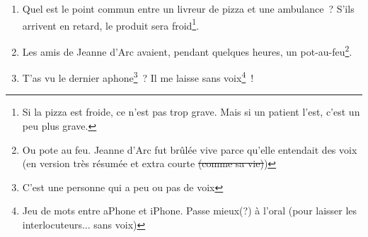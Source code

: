\documentclass[10pt,a5paper,fullpage]{book}
\begin{document}
\begin{enumerate}
		\item Quel est le point commun entre un livreur de pizza et une ambulance~? S’ils arrivent en retard, le produit sera froid\footnote{Si la pizza est froide, ce n'est pas trop grave. Mais si un patient l'est, c'est un peu plus grave.}. 
		\item Les amis de Jeanne d'Arc avaient, pendant quelques heures, un pot-au-feu\footnote{Ou pote au feu. Jeanne d'Arc fut brûlée vive parce qu'elle entendait des voix (en version très résumée et extra courte \sout{(comme sa vie)})}. 
		\item T'as vu le dernier aphone\footnote{C'est une personne qui a peu ou pas de voix}~? Il me laisse sans voix\footnote{Jeu de mots entre aPhone et iPhone. Passe mieux(?) à l'oral (pour laisser les interlocuteurs... sans voix)}~!
	\end{enumerate}
	
\end{document}
